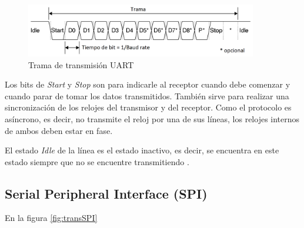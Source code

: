 \begin{figure}[H]
\centering
\includegraphics[width=0.9\textwidth]{./Figures/UART_frame.png}
\caption{Trama de transmisión UART}
\label{fig:transUART}
\end{figure}

Los bits de \textit{Start} y \textit{Stop} son para indicarle al receptor cuando debe comenzar y cuando parar de tomar los datos transmitidos. También sirve para realizar una sincronización de los relojes del transmisor y del receptor. Como el protocolo es asíncrono, es decir, no transmite el reloj por una de sus líneas, los relojes internos de ambos deben estar en fase.

El estado \textit{Idle} de la línea es el estado inactivo, es decir, se encuentra en este estado siempre que no se encuentre transmitiendo \citep{WEBSITE:3}.

\subsection{Serial Peripheral Interface (SPI)}

En la figura \ref{fig:transSPI}

